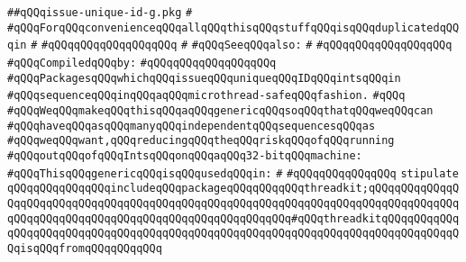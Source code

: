 \label{src/lib/src/issue-unique-id-g.pkg}
\verb|##qQQqissue-unique-id-g.pkg|\newline
\verb|#|\newline
\verb|#qQQqForqQQqconvenienceqQQqallqQQqthisqQQqstuffqQQqisqQQqduplicatedqQQqin|\newline
\verb|#|\newline
\verb|#qQQqqQQqqQQqqQQqqQQq|\newline
\verb|#|\newline
\verb|#qQQqSeeqQQqalso:|\newline
\verb|#|\newline
\verb|#qQQqqQQqqQQqqQQqqQQq|\newline
\newline
\verb|#qQQqCompiledqQQqby:|\newline
\verb|#qQQqqQQqqQQqqQQqqQQq|\newline
\newline
\newline
\verb|#qQQqPackagesqQQqwhichqQQqissueqQQquniqueqQQqIDqQQqintsqQQqin|\newline
\verb|#qQQqsequenceqQQqinqQQqaqQQqmicrothread-safeqQQqfashion.|\newline
\verb|#qQQq|\newline
\verb|#qQQqWeqQQqmakeqQQqthisqQQqaqQQqgenericqQQqsoqQQqthatqQQqweqQQqcan|\newline
\verb|#qQQqhaveqQQqasqQQqmanyqQQqindependentqQQqsequencesqQQqas|\newline
\verb|#qQQqweqQQqwant,qQQqreducingqQQqtheqQQqriskqQQqofqQQqrunning|\newline
\verb|#qQQqoutqQQqofqQQqIntsqQQqonqQQqaqQQq32-bitqQQqmachine:|\newline
\newline
\verb|#qQQqThisqQQqgenericqQQqisqQQqusedqQQqin:|\newline
\verb|#|\newline
\verb|#qQQqqQQqqQQqqQQq|\newline
\newline
\verb|stipulate|\newline
\verb|qQQqqQQqqQQqqQQqincludeqQQqpackageqQQqqQQqqQQqthreadkit;qQQqqQQqqQQqqQQqqQQqqQQqqQQqqQQqqQQqqQQqqQQqqQQqqQQqqQQqqQQqqQQqqQQqqQQqqQQqqQQqqQQqqQQqqQQqqQQqqQQqqQQqqQQqqQQqqQQqqQQqqQQqqQQq#qQQqthreadkitqQQqqQQqqQQqqQQqqQQqqQQqqQQqqQQqqQQqqQQqqQQqqQQqqQQqqQQqqQQqqQQqqQQqqQQqqQQqqQQqqQQqisqQQqfromqQQqqQQqqQQq|\newline
